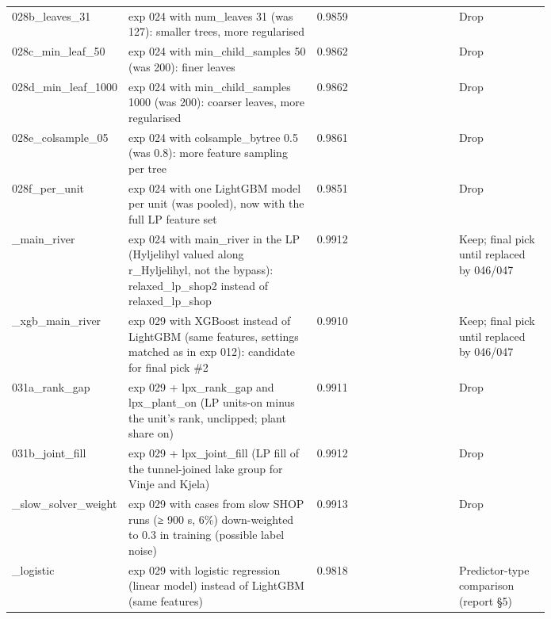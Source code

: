 \begin{longtable}{>{\raggedright\arraybackslash}p{0.16\linewidth}>{\raggedright\arraybackslash}p{0.35\linewidth}l>{\raggedright\arraybackslash}p{0.11\linewidth}>{\raggedright\arraybackslash}p{0.17\linewidth}}
028b\_\allowbreak{}leaves\_\allowbreak{}31 & exp 024 with num\_\allowbreak{}leaves 31 (was 127): smaller trees, more regularised & 0.9859 &  & Drop \\
028c\_\allowbreak{}min\_\allowbreak{}leaf\_\allowbreak{}50 & exp 024 with min\_\allowbreak{}child\_\allowbreak{}samples 50 (was 200): finer leaves & 0.9862 &  & Drop \\
028d\_\allowbreak{}min\_\allowbreak{}leaf\_\allowbreak{}1000 & exp 024 with min\_\allowbreak{}child\_\allowbreak{}samples 1000 (was 200): coarser leaves, more regularised & 0.9862 &  & Drop \\
028e\_\allowbreak{}colsample\_\allowbreak{}05 & exp 024 with colsample\_\allowbreak{}bytree 0.5 (was 0.8): more feature sampling per tree & 0.9861 &  & Drop \\
028f\_\allowbreak{}per\_\allowbreak{}unit & exp 024 with one LightGBM model per unit (was pooled), now with the full LP feature set & 0.9851 &  & Drop \\
029\_\allowbreak{}main\_\allowbreak{}river & exp 024 with main\_\allowbreak{}river in the LP (Hyljelihyl valued along r\_\allowbreak{}Hyljelihyl, not the bypass): relaxed\_\allowbreak{}lp\_\allowbreak{}shop2 instead of relaxed\_\allowbreak{}lp\_\allowbreak{}shop & 0.9912 & 0.99414 & Keep; final pick until replaced by 046/047 \\
030\_\allowbreak{}xgb\_\allowbreak{}main\_\allowbreak{}river & exp 029 with XGBoost instead of LightGBM (same features, settings matched as in exp 012): candidate for final pick \#2 & 0.9910 & 0.99429 & Keep; final pick until replaced by 046/047 \\
031a\_\allowbreak{}rank\_\allowbreak{}gap & exp 029 + lpx\_\allowbreak{}rank\_\allowbreak{}gap and lpx\_\allowbreak{}plant\_\allowbreak{}on (LP units-on minus the unit's rank, unclipped; plant share on) & 0.9911 &  & Drop \\
031b\_\allowbreak{}joint\_\allowbreak{}fill & exp 029 + lpx\_\allowbreak{}joint\_\allowbreak{}fill (LP fill of the tunnel-joined lake group for Vinje and Kjela) & 0.9912 &  & Drop \\
032\_\allowbreak{}slow\_\allowbreak{}solver\_\allowbreak{}weight & exp 029 with cases from slow SHOP runs (≥ 900 s, 6\%) down-weighted to 0.3 in training (possible label noise) & 0.9913 &  & Drop \\
034\_\allowbreak{}logistic & exp 029 with logistic regression (linear model) instead of LightGBM (same features) & 0.9818 &  & Predictor-type comparison (report §5) \\

\end{longtable}
